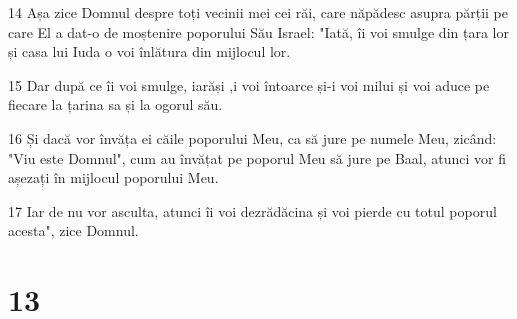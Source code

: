 \par 14 Așa zice Domnul despre toți vecinii mei cei răi, care năpădesc asupra părții pe care El a dat-o de moștenire poporului Său Israel: "Iată, îi voi smulge din țara lor și casa lui Iuda o voi înlătura din mijlocul lor.
\par 15 Dar după ce îi voi smulge, iarăși ,i voi întoarce și-i voi milui și voi aduce pe fiecare la țarina sa și la ogorul său.
\par 16 Și dacă vor învăța ei căile poporului Meu, ca să jure pe numele Meu, zicând: "Viu este Domnul", cum au învățat pe poporul Meu să jure pe Baal, atunci vor fi așezați în mijlocul poporului Meu.
\par 17 Iar de nu vor asculta, atunci îi voi dezrădăcina și voi pierde cu totul poporul acesta", zice Domnul.

\chapter{13}


